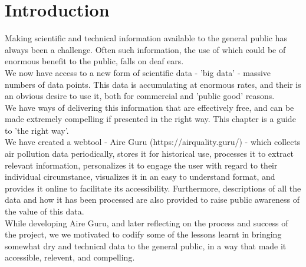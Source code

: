 \newpage
\section{Introduction}

Making scientific and technical information available to the general public has always been a challenge.
Often such information, the use of which could be of enormous benefit to the public, falls on deaf ears.\\

We now have access to a new form of scientific data - 'big data' - massive numbers of data points.
This data is accumulating at enormous rates, and their is an obvious desire to use it, both for
commercial and 'public good' reasons.\\

We have ways of delivering this information that are effectively free, and can be made extremely compelling
if presented in the right way. This chapter is a guide to 'the right way'.\\

We have created a webtool - Aire Guru (https://airquality.guru/) - which collects air pollution data periodically, stores it for historical use, 
processes it to extract relevant information, personalizes it to engage the user with regard to their individual
circumstance, visualizes it in an easy to understand format, and provides it online to facilitate its accessibility. Furthermore,
descriptions of all the data and how it has been processed are also provided to raise public awareness of the value
of this data.\\

While developing Aire Guru, and later reflecting on the process and success of the project, we we motivated to codify
some of the lessons learnt in bringing somewhat dry and technical data to the general public, in a way that made it 
accessible, relevent, and compelling.\\

